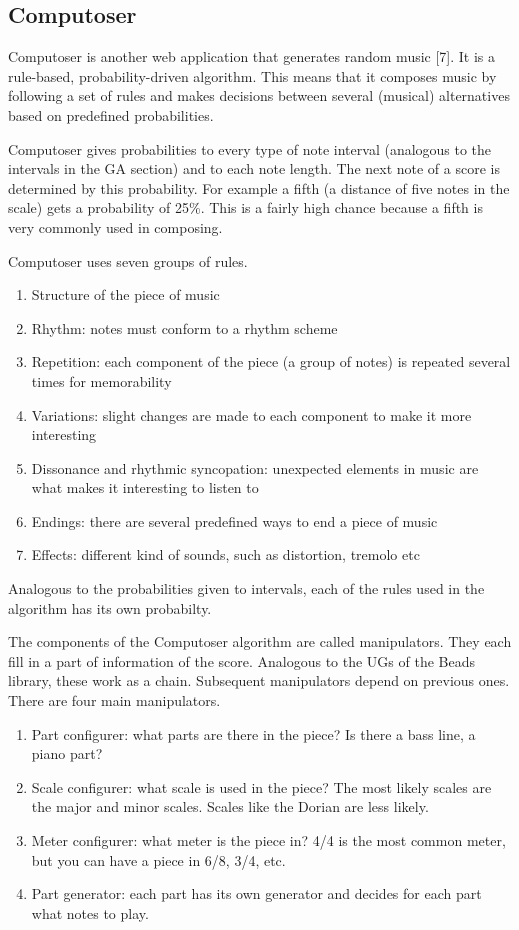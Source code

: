 \documentclass[12pt]{article}
\begin{document}
\subsection{Computoser}

Computoser is another web application that generates random music [7]. It is a rule-based, probability-driven algorithm. This means that it composes music by following a set of rules and makes decisions between several (musical) alternatives based on predefined probabilities.
\newline

Computoser gives probabilities to every type of note interval (analogous to the intervals in the GA section) and to each note length. The next note of a score is determined by this probability.
For example a fifth (a distance of five notes in the scale) gets a probability of 25\%. This is a fairly high chance because a fifth is very commonly used in composing.
\newline

Computoser uses seven groups of rules.
\begin{enumerate}
\item Structure of the piece of music 
\item Rhythm: notes must conform to a rhythm scheme
\item Repetition: each component of the piece (a group of notes) is repeated several times for memorability 
\item Variations: slight changes are made to each component to make it more interesting
\item Dissonance and rhythmic syncopation: unexpected elements in music are what makes it interesting to listen to
\item Endings: there are several predefined ways to end a piece of music
\item Effects: different kind of sounds, such as distortion, tremolo etc
\end{enumerate}

Analogous to the probabilities given to intervals, each of the rules used in the algorithm has its own probabilty.
\newline

The components of the Computoser algorithm are called manipulators. They each fill in a part of information of the score. Analogous to the UGs of the Beads library, these work as a chain. Subsequent manipulators depend on previous ones. There are four main manipulators.

\begin{enumerate}
\item Part configurer: what parts are there in the piece? Is there a bass line, a piano part?
\item Scale configurer: what scale is used in the piece? The most likely scales are the major and minor scales. Scales like the Dorian are less likely.
\item Meter configurer: what meter is the piece in? 4/4 is the most common meter, but you can have a piece in 6/8, 3/4, etc.
\item Part generator: each part has its own generator and decides for each part what notes to play.
\end{enumerate}
 
\end{document}
